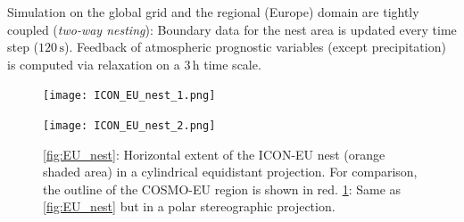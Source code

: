 Simulation on the global grid and the regional (Europe) domain are tightly coupled
(\emph{two-way nesting}):
Boundary data for the nest area is updated every time step ($120\,\mathrm{s}$).
%
Feedback of atmospheric prognostic variables (except precipitation) is
computed via relaxation on a $3\,\mathrm{h}$ time scale.

  
\begin{figure}[h]
  \begin{minipage}[b]{\textwidth}
    \centering
    \texttt{[image: ICON\_EU\_nest\_1.png]}
    \subcaption{}\label{fig:EU_nest}
  \end{minipage}
  \hfill
  \par
  \begin{minipage}[b]{\textwidth}
    \centering
    \texttt{[image: ICON\_EU\_nest\_2.png]}
    \subcaption{}\label{fig:EU_nest_polar}
  \end{minipage}\hfill
  \caption{\ref{fig:EU_nest}: Horizontal extent of the ICON-EU nest
    (orange shaded area) in a cylindrical equidistant projection. For
    comparison, the outline of the COSMO-EU region is shown in red.
    \ref{fig:EU_nest_polar}:  Same as \ref{fig:EU_nest} but in a polar
    stereographic projection.}
\end{figure}




